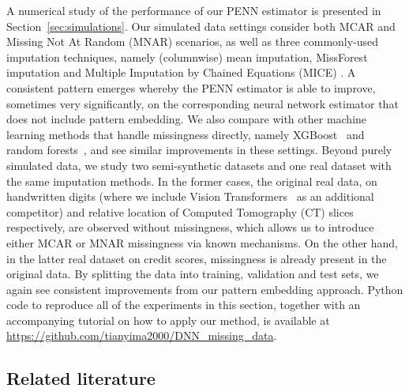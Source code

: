 \documentclass[12pt]{article}
\begin{document}
A numerical study of the performance of our PENN estimator is presented in Section~\ref{sec:simulations}.  Our simulated data settings consider both MCAR and Missing Not At Random (MNAR) scenarios, as well as three commonly-used imputation techniques, namely (columnwise) mean imputation, MissForest imputation \citep{stekhoven2012missforest} and Multiple Imputation by Chained Equations (MICE) \citep{van2011mice}.  A consistent pattern emerges whereby the PENN estimator is able to improve, sometimes very significantly, on the corresponding neural network estimator that does not include pattern embedding.  We also compare with other machine learning methods that handle missingness directly, namely XGBoost~\citep{chen2016xgboost} and random forests~\citep{breiman2001random}, and see similar improvements in these settings.  Beyond purely simulated data, we study two semi-synthetic datasets and one real dataset with the same imputation methods.  In the former cases, the original real data, on handwritten digits (where we include Vision Transformers~\citep{dosovitskiy2021an} as an additional competitor) and relative location of Computed Tomography (CT) slices respectively, are observed without missingness, which allows us to introduce either MCAR or MNAR missingness via known mechanisms.  On the other hand, in the latter real dataset on credit scores, missingness is already present in the original data.  By splitting the data into training, validation and test sets, we again see consistent improvements from our pattern embedding approach.  Python code to reproduce all of the experiments in this section, together with an accompanying tutorial on how to apply our method, is available at \url{https://github.com/tianyima2000/DNN_missing_data}.

\subsection{Related literature}
\end{document}
